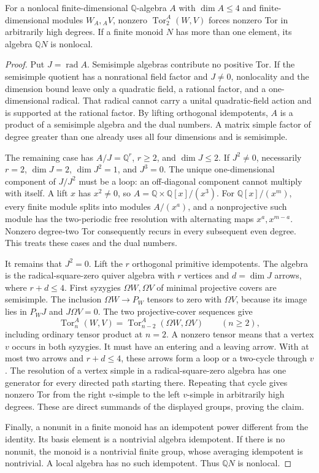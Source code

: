 \begin{lemma}
\label{CP2:A-high-small-Tor}
For a nonlocal finite-dimensional $\mathbb Q$-algebra $A$ with
$\dim A\leq4$ and finite-dimensional modules $W_A,{}_A V$,
nonzero $\operatorname{Tor}_2^A(W,V)$ forces nonzero Tor in
arbitrarily high degrees.  If a finite monoid $N$ has more
than one element, its algebra $\mathbb QN$ is nonlocal.
\end{lemma}
\begin{proof}
Put $J=\operatorname{rad}A$.  Semisimple algebras contribute
no positive Tor.  If the semisimple quotient has a nonrational
field factor and $J\ne0$, nonlocality and the dimension bound
leave only a quadratic field, a rational factor, and a
one-dimensional radical.  That radical cannot carry a unital
quadratic-field action and is supported at the rational
factor.  By lifting orthogonal idempotents, $A$ is a product
of a semisimple algebra and the dual numbers.  A matrix
simple factor of degree greater than one already uses all
four dimensions and is semisimple.

The remaining case has $A/J=\mathbb Q^r$, $r\geq2$, and
$\dim J\leq2$.  If $J^2\ne0$, necessarily $r=2$,
$\dim J=2$, $\dim J^2=1$, and $J^3=0$.  The unique
one-dimensional component of $J/J^2$ must be a loop:
an off-diagonal component cannot multiply with itself.
A lift $x$ has $x^2\ne0$, so
$A=\mathbb Q\times\mathbb Q[x]/(x^3)$.
For $\mathbb Q[x]/(x^m)$, every finite module splits into
modules $A/(x^a)$, and a nonprojective such module has the
two-periodic free resolution with alternating maps
$x^a,x^{m-a}$.  Nonzero degree-two Tor consequently recurs
in every subsequent even degree.  This treats these cases
and the dual numbers.

It remains that $J^2=0$.  Lift the $r$ orthogonal primitive
idempotents.  The algebra is the radical-square-zero quiver
algebra with $r$ vertices and $d=\dim J$ arrows, where
$r+d\leq4$.  First syzygies $\Omega W,\Omega V$ of minimal
projective covers are semisimple.  The inclusion
$\Omega W\to P_W$ tensors to zero with $\Omega V$,
because its image lies in $P_WJ$ and $J\Omega V=0$.
The two projective-cover sequences give
\[
 \operatorname{Tor}_n^A(W,V)
 =\operatorname{Tor}_{n-2}^A(\Omega W,\Omega V)
 \qquad(n\geq2),
\]
including ordinary tensor product at $n=2$.  A nonzero
tensor means that a vertex $v$ occurs in both syzygies.
It must have an entering and a leaving arrow.  With at
most two arrows and $r+d\leq4$, these arrows form a loop
or a two-cycle through $v$.  The resolution of a vertex
simple in a radical-square-zero algebra has one generator
for every directed path starting there.  Repeating that
cycle gives nonzero Tor from the right $v$-simple to the
left $v$-simple in arbitrarily high degrees.  These are
direct summands of the displayed groups, proving the claim.

Finally, a nonunit in a finite monoid has an idempotent
power different from the identity.  Its basis element is
a nontrivial algebra idempotent.  If there is no nonunit,
the monoid is a nontrivial finite group, whose averaging
idempotent is nontrivial.  A local algebra has no such
idempotent.  Thus $\mathbb QN$ is nonlocal.
\end{proof}

